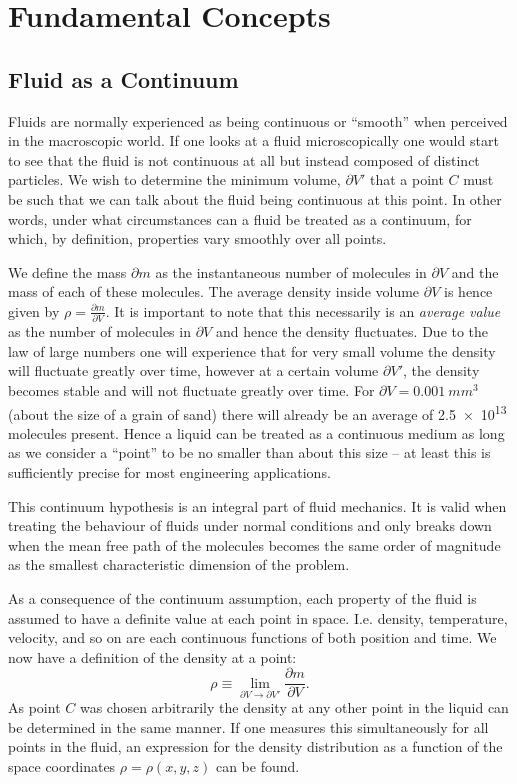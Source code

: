 
\section{Fundamental Concepts}

\subsection{Fluid as a Continuum}
Fluids are normally experienced as being continuous or ``smooth'' when perceived in the macroscopic world. If one looks at a fluid microscopically one would start to see that the fluid is not continuous at all but instead composed of distinct particles. We wish to determine the minimum volume, $\partial V'$ that a point $C$ must be such that we can talk about the fluid being continuous at this point. In other words, under what circumstances can a fluid be treated as a continuum, for which, by definition, properties vary smoothly over all points. 

We define the mass $\partial m$ as the instantaneous number of molecules in $\partial V $ and the mass of each of these molecules. The average density inside volume $\partial V $ is hence given by $\rho = \frac{\partial m }{\partial V }$. It is important to note that this necessarily is an \textit{average value} as the number of molecules in $\partial V $ and hence the density fluctuates. Due to the law of large numbers one will experience that for very small volume the density will fluctuate greatly over time, however at a certain volume $\partial V' $, the density becomes stable and will not fluctuate greatly over time. For $\partial V = \qty{0,001}{mm^3}  $ (about the size of a grain of sand) there will already be an average of \num{2,5e13} molecules present. Hence a liquid can be treated as a continuous medium as long as we consider a ``point'' to be no smaller than about this size -- at least this is sufficiently precise for most engineering applications.

This continuum hypothesis is an integral part of fluid mechanics. It is valid when treating the behaviour of fluids under normal conditions and only breaks down when the mean free path of the molecules becomes the same order of magnitude as the smallest characteristic dimension of the problem. 

As a consequence of the continuum assumption, each property of the fluid is assumed to have a definite value at each point in space. I.e. density, temperature, velocity, and so on are each continuous functions of both position and time. We now have a definition of the density at a point:
\[ 
\rho \equiv \lim_{\partial V \to \partial V'  } \frac{\partial m }{\partial V }
.\]
As point $C$ was chosen arbitrarily the density at any other point in the liquid can be determined in the same manner. If one measures this simultaneously for all points in the fluid, an expression for the density distribution as a function of the space coordinates $\rho = \rho(x,y,z)$ can be found.

